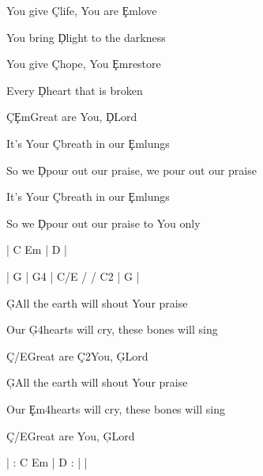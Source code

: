 \documentclass[9pt]{extarticle}
\begin{document}
\bsong

\bv
You give \c{C}life, You are \c{Em}love

You bring \c{D}light to the darkness

You give \c{C}hope, You \c{Em}restore

Every \c{D}heart that is broken

\c{C}\c{Em}Great are You, \c{D}Lord
\ev

\bc
It's Your \c{C}breath in our \c{Em}lungs

So we \c{D}pour out our praise, we pour out our praise

It's Your \c{C}breath in our \c{Em}lungs

So we \c{D}pour out our praise to You only
\ec

\bin
| C Em | D |
\ein



\bin
| G | G4 |  C/E / / C2  | G |
\ein

\bb[2]
\c{G}All the earth will shout Your praise

Our \c{G4}hearts will cry, these bones will sing

\c{C/E}Great are \c{C2}You, \c{G}Lord
\eb

\bb
\c{G}All the earth will shout Your praise

Our \c{Em4}hearts will cry, these bones will sing

\c{C/E}Great are You, \c{G}Lord
\eb


\bo
| : C Em | D : |  |
\eo

\esong
\end{document}
